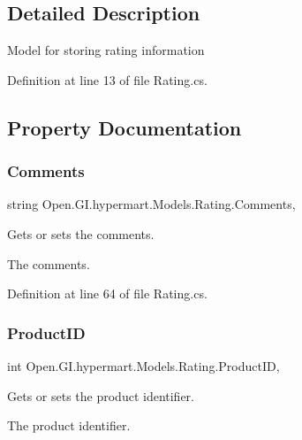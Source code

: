 \subsection{Detailed Description}
Model for storing rating information 



Definition at line 13 of file Rating.\+cs.



\subsection{Property Documentation}
\mbox{\label{class_open_1_1_g_i_1_1hypermart_1_1_models_1_1_rating_a1b1467d2d1898f6109cc19ec24ee7fd4}} 
\subsubsection{Comments}
{\footnotesize\ttfamily string Open.\+G\+I.\+hypermart.\+Models.\+Rating.\+Comments\hspace{0.3cm}{\ttfamily [get]}, {\ttfamily [set]}}



Gets or sets the comments. 

The comments. 

Definition at line 64 of file Rating.\+cs.

\mbox{\label{class_open_1_1_g_i_1_1hypermart_1_1_models_1_1_rating_a84ebcfe9c03b3ee3859323be1a9b02da}} 
\subsubsection{Product\+ID}
{\footnotesize\ttfamily int Open.\+G\+I.\+hypermart.\+Models.\+Rating.\+Product\+ID\hspace{0.3cm}{\ttfamily [get]}, {\ttfamily [set]}}



Gets or sets the product identifier. 

The product identifier. 

